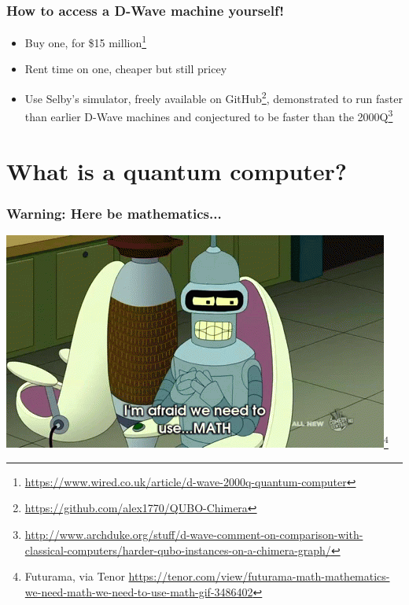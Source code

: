 \documentclass[notes]{beamer}
\begin{document}
\begin{frame}
\begin{center}
\end{center}
\end{frame}


\begin{frame}
\frametitle{How to access a D-Wave machine yourself!}

\begin{itemize}
\item<1-> Buy one, for \$15 million\footnote{\url{https://www.wired.co.uk/article/d-wave-2000q-quantum-computer}}
\item<2-> Rent time on one, cheaper but still pricey
\item<3-> Use Selby's simulator, freely available on GitHub\footnote{\url{https://github.com/alex1770/QUBO-Chimera}}, demonstrated to run faster than earlier D-Wave machines and conjectured to be faster than the 2000Q\footnote{\url{http://www.archduke.org/stuff/d-wave-comment-on-comparison-with-classical-computers/harder-qubo-instances-on-a-chimera-graph/}}
\end{itemize}
\end{frame}

\section{What is a quantum computer?}

\begin{frame}
\frametitle{Warning: Here be  mathematics...}

\begin{center}
\includegraphics[scale=0.9]{math}\footnote{Futurama, via Tenor \url{https://tenor.com/view/futurama-math-mathematics-we-need-math-we-need-to-use-math-gif-3486402}}
\end{center}

\end{frame}
\end{document}
